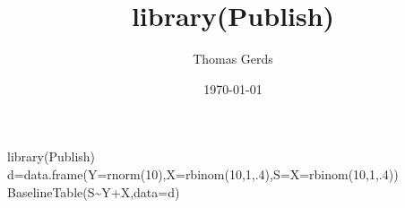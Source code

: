 \documentclass[11pt]{article}
\title{library(Publish)}
\author{Thomas Gerds}
\date{\today}
\begin{document}
\maketitle

\setcounter{tocdepth}{3}
\tableofcontents
\vspace*{1cm}
library(Publish)
d=data.frame(Y=rnorm(10),X=rbinom(10,1,.4),S=X=rbinom(10,1,.4))
BaselineTable(S\~{}Y+X,data=d)
\end{document}
